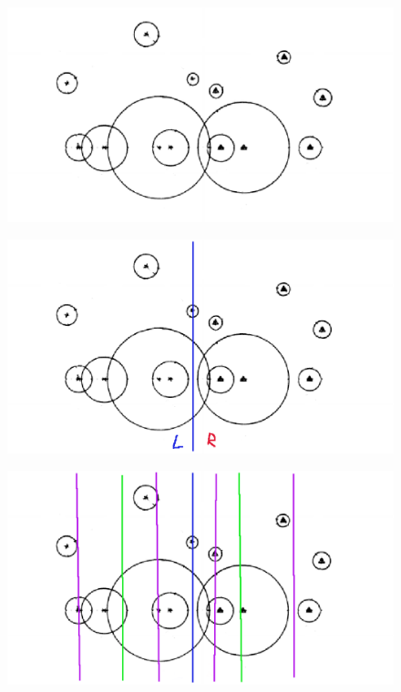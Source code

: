 \documentclass[12pt]{article}
\begin{document}
\begin{CJK}{UTF8}{bkai}
\begin{figure}[h]
\includegraphics[scale=0.4]{figure3.eps}
\caption{}
\end{figure}

\begin{figure}[h]
\includegraphics[scale=0.4]{figure4.eps}
\caption{}
\end{figure}

\begin{figure}[h]
\includegraphics[scale=0.4]{figure5.eps}
\caption{}
\end{figure}

\end{CJK}
\end{document}
